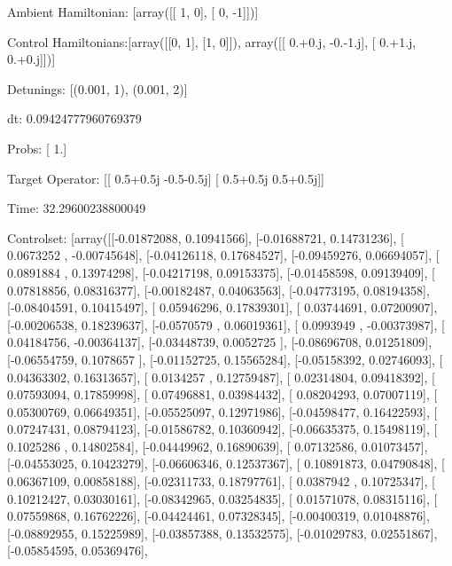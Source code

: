 \documentclass{article}
\begin{document}
    

\newpage

Ambient Hamiltonian: [array([[ 1,  0],
       [ 0, -1]])]

Control Hamiltonians:[array([[0, 1],
       [1, 0]]), array([[ 0.+0.j, -0.-1.j],
       [ 0.+1.j,  0.+0.j]])]

Detunings: [(0.001, 1), (0.001, 2)]

 dt: 0.09424777960769379

Probs: [ 1.]

Target Operator: [[ 0.5+0.5j -0.5-0.5j]
 [ 0.5+0.5j  0.5+0.5j]]

Time: 32.29600238800049

Controlset: [array([[-0.01872088,  0.10941566],
       [-0.01688721,  0.14731236],
       [ 0.0673252 , -0.00745648],
       [-0.04126118,  0.17684527],
       [-0.09459276,  0.06694057],
       [ 0.0891884 ,  0.13974298],
       [-0.04217198,  0.09153375],
       [-0.01458598,  0.09139409],
       [ 0.07818856,  0.08316377],
       [-0.00182487,  0.04063563],
       [-0.04773195,  0.08194358],
       [-0.08404591,  0.10415497],
       [ 0.05946296,  0.17839301],
       [ 0.03744691,  0.07200907],
       [-0.00206538,  0.18239637],
       [-0.0570579 ,  0.06019361],
       [ 0.0993949 , -0.00373987],
       [ 0.04184756, -0.00364137],
       [-0.03448739,  0.0052725 ],
       [-0.08696708,  0.01251809],
       [-0.06554759,  0.1078657 ],
       [-0.01152725,  0.15565284],
       [-0.05158392,  0.02746093],
       [ 0.04363302,  0.16313657],
       [ 0.0134257 ,  0.12759487],
       [ 0.02314804,  0.09418392],
       [ 0.07593094,  0.17859998],
       [ 0.07496881,  0.03984432],
       [ 0.08204293,  0.07007119],
       [ 0.05300769,  0.06649351],
       [-0.05525097,  0.12971986],
       [-0.04598477,  0.16422593],
       [ 0.07247431,  0.08794123],
       [-0.01586782,  0.10360942],
       [-0.06635375,  0.15498119],
       [ 0.1025286 ,  0.14802584],
       [-0.04449962,  0.16890639],
       [ 0.07132586,  0.01073457],
       [-0.04553025,  0.10423279],
       [-0.06606346,  0.12537367],
       [ 0.10891873,  0.04790848],
       [ 0.06367109,  0.00858188],
       [-0.02311733,  0.18797761],
       [ 0.0387942 ,  0.10725347],
       [ 0.10212427,  0.03030161],
       [-0.08342965,  0.03254835],
       [ 0.01571078,  0.08315116],
       [ 0.07559868,  0.16762226],
       [-0.04424461,  0.07328345],
       [-0.00400319,  0.01048876],
       [-0.08892955,  0.15225989],
       [-0.03857388,  0.13532575],
       [-0.01029783,  0.02551867],
       [-0.05854595,  0.05369476],
\end{document}
